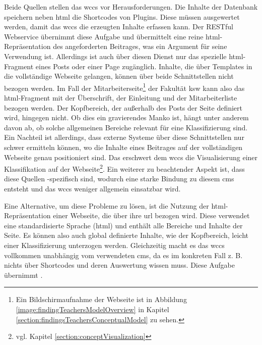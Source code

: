         Beide Quellen stellen das \gls{wccs} vor Herausforderungen.
        Die Inhalte der Datenbank speichern neben \gls{html} die Shortcodes
        von Plugins.
        Diese müssen ausgewertet werden, damit das \gls{wccs} die erzeugten Inhalte
        erfassen kann.
        Der RESTful Webservice übernimmt diese Aufgabe und übermittelt
        eine reine \gls{html}-Repräsentation des angeforderten Beitrages,
        was ein Argument für seine Verwendung ist.
        Allerdings ist auch über diesen Dienst nur das spezielle \gls{html}-Fragment eines
        Posts oder einer Page zugänglich.
        Inhalte, die über Templates in die vollständige Webseite gelangen,
        können über beide Schnittstellen nicht bezogen werden.
        Im Fall der Mitarbeiterseite\footnote{Ein Bildschirmaufnahme der Webseite
        ist in Abbildung \ref{image:findingTeachersModelOverview} in Kapitel
        \ref{section:findingsTeachersConceptualModel} zu sehen.}
        der Fakultät \gls{ksw}
        kann also das \gls{html}-Fragment mit der Überschrift, der Einleitung
        und der Mitarbeiterliste bezogen werden.
        Der Kopfbereich, der außerhalb des Posts der Seite definiert wird,
        hingegen nicht.
        Ob dies ein gravierendes Manko ist, hängt unter anderem davon ab,
        ob solche allgemeinen Bereiche relevant für eine Klassifizierung sind.
        Ein Nachteil ist allerdings, dass externe Systeme über diese Schnittstellen
        nur schwer ermitteln können, wo die Inhalte eines Beitrages auf der vollständigen Webseite genau positioniert sind.
        Das erschwert dem \gls{wccs} die Visualisierung einer
        Klassifikation auf der Webseite\footnote{vgl. Kapitel \ref{section:conceptVisualization}}.       
        Ein weiterer zu beachtender Aspekt ist, dass diese Quellen {\wordpress}-spezifisch sind,
        wodurch eine starke Bindung zu diesem \gls{cms} entsteht
        und das \gls{wccs} weniger allgemein einsatzbar wird.

        Eine Alternative, um diese Probleme zu lösen,
        ist die Nutzung der \gls{html}-Repräsentation einer Webseite,
        die über ihre \gls{url} bezogen wird.
        Diese verwendet eine standardisierte Sprache (\gls{html}) und enthält
        alle Bereiche und Inhalte der Seite.
        Es können also auch global definierte Inhalte,
        wie der Kopfbereich, leicht einer Klassifizierung unterzogen werden.
        Gleichzeitig macht es das \gls{wccs} vollkommen unabhängig vom verwendeten \gls{cms},
        da es im konkreten Fall z. B. nichts über Shortcodes und deren Auswertung wissen muss.
        Diese Aufgabe übernimmt {\wordpress}.

